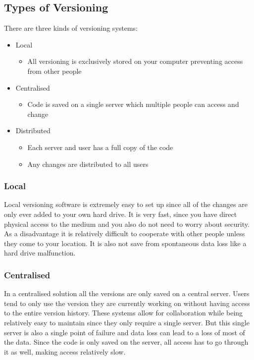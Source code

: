 \documentclass{article}
\begin{document}
	\subsection{Types of Versioning}
	There are three kinds of versioning systems:
	\begin{itemize}
		\item{Local}
		\begin{itemize}
			\item{All versioning is exclusively stored on your computer preventing access from other people}
		\end{itemize}
		\item{Centralised}
		\begin{itemize}
			\item{Code is saved on a single server which multiple people can access and change}
		\end{itemize}
		\item{Distributed}
		\begin{itemize}
			\item{Each server and user has a full copy of the code}
			\item{Any changes are distributed to all users}
		\end{itemize}
	\end{itemize}
	\subsubsection{Local}
	Local versioning software is extremely easy to set up since all of the changes are only ever added to your own hard drive. It is very fast, since you have direct physical access to the medium and you also do not need to worry about security. \\
	As a disadvantage it is relatively difficult to cooperate with other people unless they come to your location. It is also not save from spontaneous data loss like a hard drive malfunction.
	\subsubsection{Centralised}
	In a centralised solution all the versions are only saved on a central server. Users tend to only use the version they are currently working on without having access to the entire version history. These systems allow for collaboration while being relatively easy to maintain since they only require a single server. But this single server is also a single point of failure and data loss can lead to a loss of most of the data. Since the code is only saved on the server, all access has to go through it as well, making access relatively slow.
\end{document}
